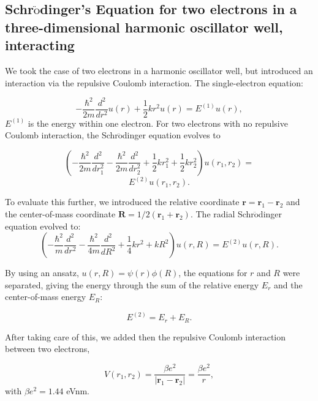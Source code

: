 \documentclass[%
reprint,
superscriptaddress,
showpacs,
nofootinbib,
bibnotes,amsmath,amssymb,aps,
prc, 
]{revtex4-1}
\begin{document}
	\subsection{Schr$\ddot{\textrm{o}}$dinger's Equation for two electrons in a three-dimensional harmonic oscillator well, interacting}	
	We took the case of two electrons in a harmonic oscillator well, but
	introduced an interaction via the repulsive Coulomb interaction.
	The single-electron equation:
	
	\begin{equation*}
		-\frac{\hbar^2}{2 m} \frac{d^2}{dr^2} u(r) 
		+ \frac{1}{2}k r^2u(r)  = E^{(1)} u(r),
	\end{equation*}
	$E^{(1)}$ is the energy within one electron.
	For two electrons with no repulsive Coulomb interaction, the
	Schr$\ddot{\textrm{o}}$dinger equation evolves to
	
	\begin{equation*}
		\left(  -\frac{\hbar^2}{2 m} \frac{d^2}{dr_1^2} -\frac{\hbar^2}{2 m} \frac{d^2}{dr_2^2}+ \frac{1}{2}k r_1^2+ \frac{1}{2}k r_2^2\right)u(r_1,r_2)  =
	\end{equation*}
	\begin{equation*}
		E^{(2)} u(r_1,r_2) .
	\end{equation*}
	
	To evaluate this further, we introduced the relative coordinate $\mathbf{r} = \mathbf{r}_1-\mathbf{r}_2$
	and the center-of-mass coordinate $\mathbf{R} = 1/2(\mathbf{r}_1+\mathbf{r}_2)$.
	The radial Schr$\ddot{\textrm{o}}$dinger equation evolved to:
	\begin{equation*}
		\left(  -\frac{\hbar^2}{m} \frac{d^2}{dr^2} -\frac{\hbar^2}{4 m} \frac{d^2}{dR^2}+ \frac{1}{4} k r^2+  kR^2\right)u(r,R)  = E^{(2)} u(r,R).
	\end{equation*}
	
	By using an ansatz, $u(r,R) = \psi(r)\phi(R)$, the equations for $r$ and $R$ were separated, giving the energy through the sum
	of the relative energy $E_r$ and the center-of-mass energy $E_R$:
	
	\begin{equation*}
		E^{(2)}=E_r+E_R.
	\end{equation*}
	
	After taking care of this, we added then the repulsive Coulomb interaction between two electrons,
	
	\begin{equation*}
		V(r_1,r_2) = \frac{\beta e^2}{|\mathbf{r}_1-\mathbf{r}_2|}=\frac{\beta e^2}{r},
	\end{equation*}
	with $\beta e^2=1.44$ eVnm.
	
\end{document}
